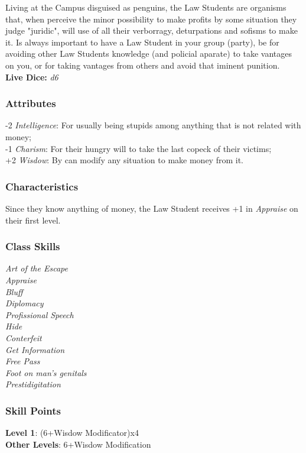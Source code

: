 \documentclass[ letterpaper,12pt]{article}
\begin{document}
Living at the Campus disguised as penguins, the Law Students are organisms
that, when perceive the minor possibility to make profits by some situation
they judge "juridic", will use of all their verborragy, deturpations and
sofisms to make it. Is always important to have a Law Student in your group
(party), be for avoiding other Law Students knowledge (and policial aparate) to
take vantages on you, or for taking vantages from others and avoid that iminent
punition.\\

{\bf Live Dice:} {\it d6}

\subsubsection{Attributes}
-2 {\it Intelligence}: For usually being stupids among anything that is not related with money;\\
-1 {\it Charism}: For their hungry will to take the last copeck of their victims;\\
+2 {\it Wisdow}: By can modify any situation to make money from it.\\

\subsubsection{Characteristics}

Since they know anything of money, the Law Student receives +1 in {\it Appraise} on their first level.

\subsubsection{Class Skills}
{\it
Art of the Escape\\
Appraise\\
Bluff\\
Diplomacy\\
Profissional Speech\\
Hide\\
Conterfeit\\
Get Information\\
Free Pass\\
Foot on man's genitals\\
Prestidigitation}

\subsubsection{Skill Points}
{\bf Level 1}: (6+Wisdow Modificator)x4\\
{\bf Other Levels}: 6+Wisdow Modification\\
\end{document}
